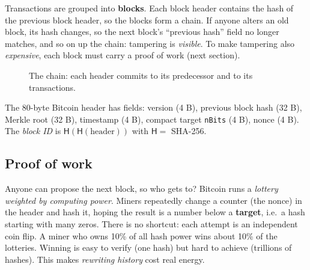 \documentclass[11pt,a4paper]{article}
\newenvironment{plainenglish}{\par\smallskip}{\par\smallskip}
\theoremstyle{definition}
\theoremstyle{plain}
\theoremstyle{remark}
\newcommand{\Hash}{\mathsf{H}}
\begin{document}
\begin{plainenglish}
Transactions are grouped into \textbf{blocks}. Each block header contains the hash of the previous block header, so the blocks form a chain. If anyone alters an old block, its hash changes,
so the next block's ``previous hash'' field no longer matches, and so on up the chain: tampering is \emph{visible}. To make tampering also \emph{expensive}, each block must carry a proof of
work (next section).
\end{plainenglish}

\begin{figure}[htbp]
\centering
{}
\caption{The chain: each header commits to its predecessor and to its transactions.}
\end{figure}

The 80-byte Bitcoin header has fields: version (4 B), previous block hash (32 B), Merkle root (32 B), timestamp (4 B), compact target \texttt{nBits} (4 B), nonce (4 B). The \emph{block ID} is
$\Hash(\Hash(\text{header}))$ with $\Hash=$ SHA-256.

\subsection{Proof of work}

\begin{plainenglish}
Anyone can propose the next block, so who gets to? Bitcoin runs a \emph{lottery weighted by computing power}. Miners repeatedly change a counter (the nonce) in the header and hash it, hoping the result is a
number below a \textbf{target}, i.e.\ a hash starting with many zeros. There is no shortcut: each attempt is an independent coin flip. A miner who owns 10\% of all hash power wins about 10\% of the lotteries.
Winning is easy to verify (one hash) but hard to achieve (trillions of hashes). This makes \emph{rewriting history} cost real energy.
\end{plainenglish}
\end{document}
